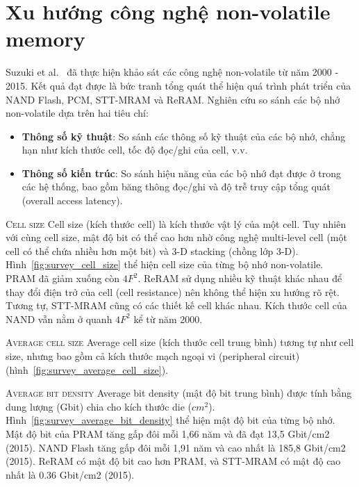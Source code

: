 \clearpage
\section{Xu hướng công nghệ non-volatile memory}
\label{chap:experiments}

Suzuki et al.~\cite{suzukiSurveyTrendsNonVolatile2015a} đã thực hiện khảo sát
các công nghệ non-volatile từ năm 2000 - 2015. Kết quả đạt được là bức tranh
tổng quát thể hiện quá trình phát triển của NAND Flash, PCM, STT-MRAM và ReRAM.
Nghiên cứu so sánh các bộ nhớ non-volatile dựa trên hai tiêu chí:

\begin{itemize}
    \item \textbf{Thông số kỹ thuật}: So sánh các thông số kỹ thuật của các bộ
    nhớ, chẳng hạn như kích thước cell, tốc độ đọc/ghi của cell, v.v.

    \item \textbf{Thông số kiến trúc}: So sánh hiệu năng của các bộ nhớ đạt
    được ở trong các hệ thống, bao gồm băng thông đọc/ghi và độ trễ truy cập
    tổng quát (overall access latency).
\end{itemize}

\textsc{Cell size} \hspace{0.5cm} Cell size (kích thước cell) là kích thước vật
lý của một cell. Tuy nhiên với cùng cell size, mật độ bit có thể cao hơn nhờ
công nghệ multi-level cell (một cell có thể chứa nhiều hơn một bit) và 3-D
stacking (chồng lớp 3-D). Hình~\ref{fig:survey_cell_size} thể hiện cell size
của từng bộ nhớ non-volatile. PRAM đã giảm xuống còn $4F^2$. ReRAM sử dụng
nhiều kỹ thuật khác nhau để thay đổi điện trở của cell (cell resistance) nên
không thể hiện xu hướng rõ rệt. Tương tự, STT-MRAM cũng có các thiết kế cell
khác nhau. Kích thước cell của NAND vẫn nằm ở quanh $4F^2$ kể từ năm 2000.


\textsc{Average cell size} \hspace{0.5cm} Average cell size (kích thước cell
trung bình) tương tự như cell size, nhưng bao gồm cả kích thước mạch ngoại vi
(peripheral circuit) (hình~\ref{fig:survey_average_cell_size}).


\textsc{Average bit density} \hspace{0.5cm} Average bit density (mật độ bit
trung bình) được tính bằng dung lượng (Gbit) chia cho kích thước die ($cm^2$).
Hình~\ref{fig:survey_average_bit_density} thể hiện mật độ bit của từng bộ nhớ.
Mật độ bit của PRAM tăng gấp đôi mỗi 1,66 năm và đã đạt 13,5 Gbit/cm2 (2015).
NAND Flash tăng gấp đôi mỗi 1,91 năm và cao nhất là 185,8 Gbit/cm2 (2015).
ReRAM có mật độ bit cao hơn PRAM, và STT-MRAM có mật độ cao nhất là 0.36
Gbit/cm2 (2015).

